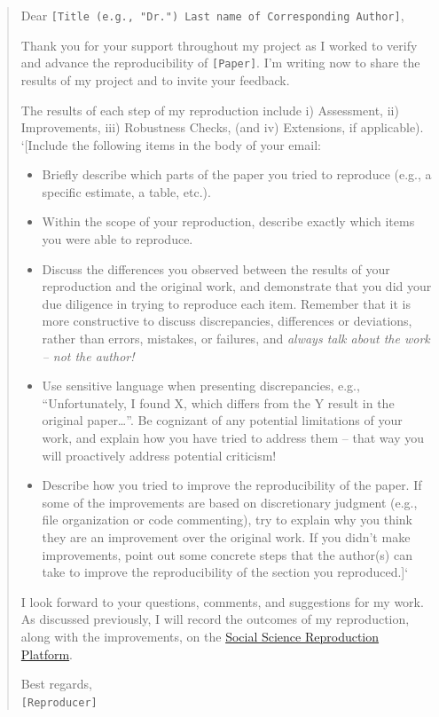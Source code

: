\documentclass[
]{book}
\providecommand{\tightlist}{%
  \setlength{\itemsep}{0pt}\setlength{\parskip}{0pt}}
\begin{document}
\begin{quote}
Dear \texttt{{[}Title\ (e.g.,\ "Dr.")\ Last\ name\ of\ Corresponding\ Author{]}},

Thank you for your support throughout my project as I worked to verify and advance the reproducibility of \texttt{{[}Paper{]}}. I'm writing now to share the results of my project and to invite your feedback.

The results of each step of my reproduction include i) Assessment, ii) Improvements, iii) Robustness Checks, (and iv) Extensions, if applicable).\\
`{[}Include the following items in the body of your email:

\begin{itemize}
\tightlist
\item
  Briefly describe which parts of the paper you tried to reproduce (e.g., a specific estimate, a table, etc.).\\
\item
  Within the scope of your reproduction, describe exactly which items you were able to reproduce.\\
\item
  Discuss the differences you observed between the results of your reproduction and the original work, and demonstrate that you did your due diligence in trying to reproduce each item. Remember that it is more constructive to discuss discrepancies, differences or deviations, rather than errors, mistakes, or failures, and \emph{always talk about the work -- not the author!}\\
\item
  Use sensitive language when presenting discrepancies, e.g., ``Unfortunately, I found X, which differs from the Y result in the original paper\ldots{}''. Be cognizant of any potential limitations of your work, and explain how you have tried to address them -- that way you will proactively address potential criticism!\\
\item
  Describe how you tried to improve the reproducibility of the paper. If some of the improvements are based on discretionary judgment (e.g., file organization or code commenting), try to explain why you think they are an improvement over the original work. If you didn't make improvements, point out some concrete steps that the author(s) can take to improve the reproducibility of the section you reproduced.{]}`
\end{itemize}

I look forward to your questions, comments, and suggestions for my work. As discussed previously, I will record the outcomes of my reproduction, along with the improvements, on the \href{https://www.socialsciencereproduction.org/}{Social Science Reproduction Platform}.

Best regards,\\
\texttt{{[}Reproducer{]}}
\end{quote}
\end{document}

